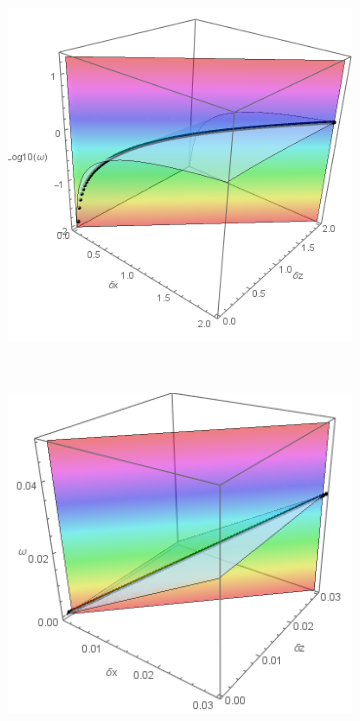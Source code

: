 \documentclass[a4paper,11pt]{article}
\begin{document}
\begin{figure}[!h]
	\centering		
	\begin{subfigure}{0.36\linewidth}
		\includegraphics[width=1\linewidth]{FIGURES/Fig_Homogeneous.png}
		\caption{}
	\end{subfigure}
	~
	\centering		
	\begin{subfigure}{0.36\linewidth}
		\includegraphics[width=1\linewidth]{FIGURES/Fig_Homogeneousz.png}

\end{subfigure}
\end{figure}
\end{document}
